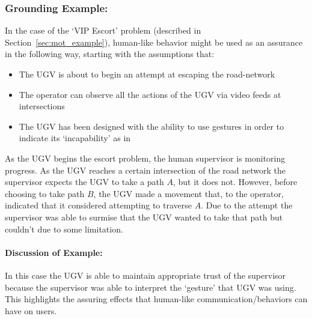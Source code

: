 %

\subsubsection{Grounding Example:}
In the case of the `VIP Escort' problem (described in Section~\ref{sec:mot_example}), human-like behavior might be used as an assurance in the following way, starting with the assumptions that:

\begin{itemize}
    \item The UGV is about to begin an attempt at escaping the road-network
    \item The operator can observe all the actions of the UGV via video feeds at intersections
    \item The UGV has been designed with the ability to use gestures in order to indicate its `incapability' as in \cite{Kwon2018-xt}
\end{itemize}

As the UGV begins the escort problem, the human supervisor is monitoring progress. As the UGV reaches a certain intersection of the road network the supervisor expects the UGV to take a path $A$, but it does not. However, before choosing to take path $B$, the UGV made a movement that, to the operator, indicated that it considered attempting to traverse $A$. Due to the attempt the supervisor was able to surmise that the UGV wanted to take that path but couldn't due to some limitation.

\paragraph{\textbf{Discussion of Example:}} In this case the UGV is able to maintain appropriate trust of the supervisor because the supervisor was able to interpret the `gesture' that UGV was using. This highlights the assuring effects that human-like communication/behaviors can have on users.
